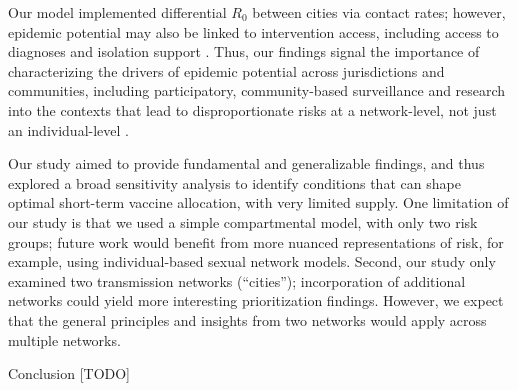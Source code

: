 Our model implemented differential $R_0$ between cities via contact rates;
however, epidemic potential may also be linked to intervention access,
including access to diagnoses and isolation support \cite{}.
Thus, our findings signal the importance of characterizing
the drivers of epidemic potential across jurisdictions and communities,
including participatory, community-based surveillance and research
into the contexts that lead to disproportionate risks at a network-level,
not just an individual-level \cite{Baral2013,Cevik2021}.
\par
Our study aimed to provide fundamental and generalizable findings, and thus
explored a broad sensitivity analysis to identify conditions that can shape
optimal short-term vaccine allocation, with very limited supply.
One limitation of our study is that
we used a simple compartmental model, with only two risk groups;
future work would benefit from more nuanced representations of risk,
for example, using individual-based sexual network models.
Second, our study only examined two transmission networks (``cities'');
incorporation of additional networks could yield more interesting prioritization findings.
However, we expect that the general principles and insights from two networks
would apply across multiple networks.
\par
Conclusion [TODO]